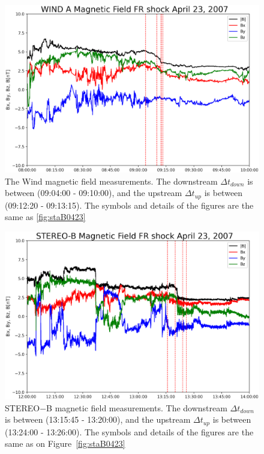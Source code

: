 \documentclass[draft]{agujournal2019}
\begin{document}
\pagebreak 

\begin{figure}[!t]
\centering
\includegraphics[width=1.\textwidth]{jgr-2023-ipshocks-f24.eps}
\caption{The Wind magnetic field measurements. The downstream $\Delta t_{down}$ is between (09:04:00 - 09:10:00), and the upstream $\Delta t_{up}$ is between (09:12:20 - 09:13:15). The symbols and details of the figures are the same as \ref{fig:staB0423}}
\label{fig:windB0423}
\end{figure}

\pagebreak

\begin{figure}[!t]
\centering
\includegraphics[width=1.\textwidth]{jgr-2023-ipshocks-f25.eps}
\caption{STEREO$-$B magnetic field measurements. The downstream $\Delta t_{down}$ is between (13:15:45 - 13:20:00), and the upstream $\Delta t_{up}$ is between (13:24:00 - 13:26:00). The symbols and details of the figures are the same as on Figure~\ref{fig:staB0423}}
\label{fig:stbB0423}
 \end{figure}
\end{document}
